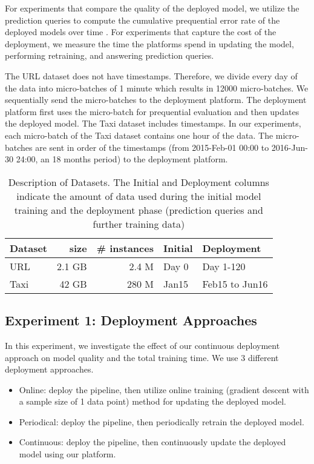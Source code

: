 For experiments that compare the quality of the deployed model, we utilize the prediction queries to compute the cumulative prequential error rate of the deployed models over time \cite{dawid1984present}.
For experiments that capture the cost of the deployment, we measure the time the platforms spend in updating the model, performing retraining, and answering prediction queries.

The URL dataset does not have timestamps. 
Therefore, we divide every day of the data into micro-batches of 1 minute which results in 12000 micro-batches.
We sequentially send the micro-batches to the deployment platform.
The deployment platform first uses the micro-batch for prequential evaluation and then updates the deployed model.
The Taxi dataset includes timestamps. 
In our experiments, each micro-batch of the Taxi dataset contains one hour of the data. 
The micro-batches are sent in order of the timestamps (from 2015-Feb-01  00:00 to 2016-Jun-30 24:00, an 18 months period) to the deployment platform.
\begin{table}[h!]
\centering
\begin{tabular}{lrrll}
\hline
\textbf{Dataset}  & \textbf{size} &\textbf{\# instances} & \textbf{Initial} & \textbf{Deployment} \\
\hline
URL        &  2.1 GB 	& 2.4 M  			& Day 0        	  & Day 1-120          \\
Taxi        &  42 GB 	    & 280 M            & Jan15              & Feb15 to Jun16    \\
\hline
\end{tabular}
\caption{Description of Datasets. The Initial and Deployment columns indicate the amount of data used during the initial model training and the deployment phase (prediction queries and further training data)}  
\label{dataset-description}
\end{table}

\subsection{Experiment 1: Deployment Approaches}
In this experiment, we investigate the effect of our continuous deployment approach on model quality and the total training time.
We use 3 different deployment approaches.
\begin{itemize}
\item Online: deploy the pipeline, then utilize online training (gradient descent with a sample size of 1 data point) method for updating the deployed model.
\item Periodical: deploy the pipeline, then periodically retrain the deployed model.
\item Continuous: deploy the pipeline, then continuously update the deployed model using our platform.
\end{itemize}

